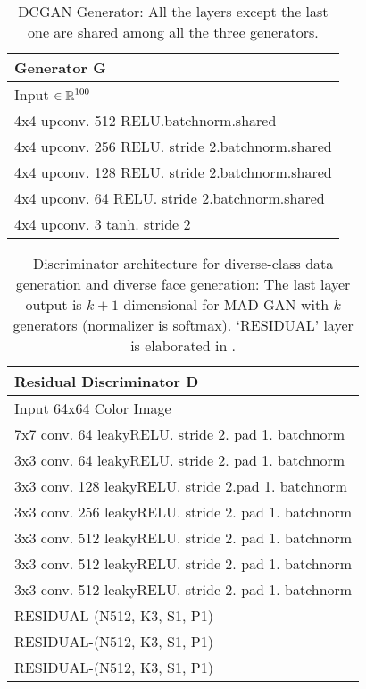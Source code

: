 \begin{center}
	\begin{table}
		\begin{tabular}{ | m{22em} | } 
			\hline
			\textbf{Generator G}\\
			\hline
			Input $\in \operatorname{\mathbb{R}}^{100}$\\
			\hline
			4x4 upconv. 512 RELU.batchnorm.shared\\
			\hline
			4x4 upconv. 256 RELU. stride 2.batchnorm.shared\\
			\hline
			4x4 upconv. 128 RELU. stride 2.batchnorm.shared\\
			\hline 
			4x4 upconv. 64 RELU. stride 2.batchnorm.shared\\
			\hline
			4x4 upconv. 3 tanh. stride 2\\
			\hline
		\end{tabular}
		\caption{\label{tab:dcgan-gen}DCGAN Generator: All the layers except the last one are shared among all the three generators.}
	\end{table}
\end{center}

\begin{center}
	\begin{table}
		\begin{tabular}{ | m{22em} |} 
			\hline
			\textbf{Residual Discriminator D} \\
			\hline
			Input 64x64 Color Image \\
			\hline
			7x7 conv. 64 leakyRELU. stride 2. pad 1. batchnorm \\
			\hline
			3x3 conv. 64 leakyRELU. stride 2. pad 1. batchnorm \\
			\hline
			3x3 conv. 128 leakyRELU. stride 2.pad 1.  batchnorm \\
			\hline
			3x3 conv. 256 leakyRELU. stride 2. pad 1. batchnorm \\
			\hline 
			3x3 conv. 512 leakyRELU. stride 2. pad 1. batchnorm \\  
			\hline
			3x3 conv. 512 leakyRELU. stride 2. pad 1. batchnorm \\ 
			\hline
			3x3 conv. 512 leakyRELU. stride 2. pad 1. batchnorm \\
			\hline
			RESIDUAL-(N512, K3, S1, P1) \\
			\hline
			RESIDUAL-(N512, K3, S1, P1) \\
			\hline
			RESIDUAL-(N512, K3, S1, P1) \\
			
			\hline
		\end{tabular}
		\caption{\label{tab:res-disc}Discriminator architecture for diverse-class data generation and diverse face generation: The last layer output is $k+1$ dimensional for MAD-GAN with $k$ generators (normalizer is softmax). `RESIDUAL' layer is elaborated in .}
	\end{table}
\end{center}

